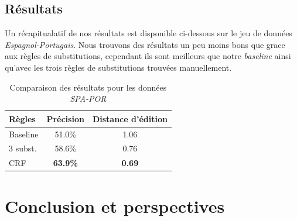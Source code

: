 \documentclass{article}
\begin{document}
\subsection{Résultats}
Un récapitualatif de nos résultats est disponible ci-dessous sur le jeu de données \emph{Espagnol-Portugais}. Nous trouvons des résultats un peu moins bons que grace aux règles de substitutions, cependant ils sont meilleurs que notre \emph{baseline} ainsi qu'avec les trois règles de substitutions trouvées manuellement.

\begin{table}[H]
    \caption{Comparaison des résultats pour les données \emph{SPA-POR}}
\begin{center}
\begin{tabular}{|l|c|c|}
\hline
Règles&Précision&Distance d'édition\\
\hline
Baseline&51.0\%&1.06\\
\hline
3 subst.&58.6\%&0.76\\
\hline
CRF&\textbf{63.9\%}&\textbf{0.69}\\
\hline
\end{tabular}
\end{center}
\end{table}

\section{Conclusion et perspectives}


\end{document}
